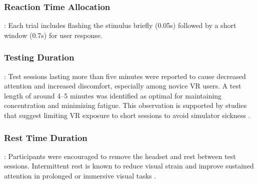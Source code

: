 \documentclass{l4proj}
\begin{document}
\begin{appendices}
\subsubsection{Reaction Time Allocation}:
Each trial includes flashing the stimulus briefly (0.05s) followed by a short window (0.7s) for user response. 

\subsubsection{Testing Duration}:
Test sessions lasting more than five minutes were reported to cause decreased attention and increased discomfort, especially among novice VR users. A test length of around 4–5 minutes was identified as optimal for maintaining concentration and minimizing fatigue. This observation is supported by studies that suggest limiting VR exposure to short sessions to avoid simulator sickness \citep{eval4}.

\subsubsection{Rest Time Duration}:
Participants were encouraged to remove the headset and rest between test sessions. Intermittent rest is known to reduce visual strain and improve sustained attention in prolonged or immersive visual tasks \citep{eval4}.

\clearpage

\end{appendices}
\end{document}
